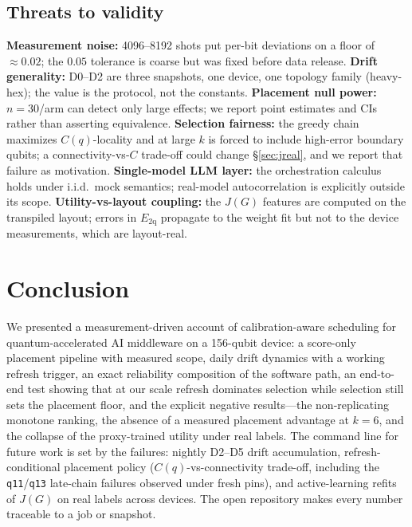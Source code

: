 \documentclass[journal,10pt,twocolumn]{IEEEtran}
\newcommand{\q}[1]{\texttt{q#1}}
\begin{document}
\subsection{Threats to validity}
\textbf{Measurement noise:} 4096--8192 shots put per-bit deviations on a floor of $\approx0.02$; the $0.05$
tolerance is coarse but was fixed before data release. \textbf{Drift generality:} D0--D2 are three snapshots, one
device, one topology family (heavy-hex); the value is the protocol, not the constants. \textbf{Placement null
power:} $n{=}30$/arm can detect only large effects; we report point estimates and CIs rather than asserting
equivalence. \textbf{Selection fairness:} the greedy chain maximizes $C(q)$-locality and at large $k$ is forced to
include high-error boundary qubits; a connectivity-vs-$C$ trade-off could change \S\ref{sec:jreal}, and we report
that failure as motivation. \textbf{Single-model LLM layer:} the orchestration calculus holds under i.i.d.\ mock
semantics; real-model autocorrelation is explicitly outside its scope. \textbf{Utility-vs-layout coupling:} the
$J(G)$ features are computed on the transpiled layout; errors in $E_{\mathrm{2q}}$ propagate to the weight fit but
not to the device measurements, which are layout-real.

\section{Conclusion}
We presented a measurement-driven account of calibration-aware scheduling for quantum-accelerated AI middleware on
a 156-qubit device: a score-only placement pipeline with measured scope, daily drift dynamics with a working
refresh trigger, an exact reliability composition of the software path, an end-to-end test showing that at our
scale refresh dominates selection while selection still sets the placement floor, and the explicit negative
results---the non-replicating monotone ranking, the absence of a measured placement advantage at $k{=}6$, and the
collapse of the proxy-trained utility under real labels. The command line for future work is set by the failures:
nightly D2--D5 drift accumulation, refresh-conditional placement policy ($C(q)$-vs-connectivity trade-off, including
the \q{11}/\q{13} late-chain failures observed under fresh pins), and active-learning refits of $J(G)$ on real
labels across devices. The open repository makes every number traceable to a job or snapshot.
\end{document}
